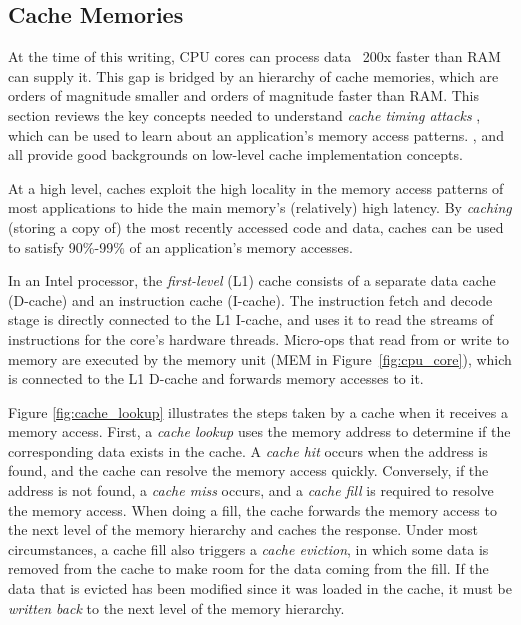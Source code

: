 \subsection{Cache Memories}
\label{sec:caching}

At the time of this writing, CPU cores can process data ~200x faster than RAM
can supply it. This gap is bridged by an hierarchy of cache memories, which are
orders of magnitude smaller and orders of magnitude faster than RAM. This
section reviews the key concepts needed to understand \textit{cache timing
attacks} \cite{banescu2011cache}, which can be used to learn about an
application's memory access patterns. \cite{smith1982cache},
\cite{patterson2013architecture} and \cite{hennessy2012architecture} all
provide good backgrounds on low-level cache implementation concepts.

At a high level, caches exploit the high locality in the memory access patterns
of most applications to hide the main memory's (relatively) high latency. By
\textit{caching} (storing a copy of) the most recently accessed code and data,
caches can be used to satisfy 90\%-99\% of an application's memory accesses.

In an Intel processor, the \textit{first-level} (L1) cache consists of a
separate data cache (D-cache) and an instruction cache (I-cache). The
instruction fetch and decode stage is directly connected to the L1 I-cache, and
uses it to read the streams of instructions for the core's hardware threads.
Micro-ops that read from or write to memory are executed by the memory unit
(MEM in Figure~\ref{fig:cpu_core}), which is connected to the L1 D-cache and
forwards memory accesses to it.

Figure \ref{fig:cache_lookup} illustrates the steps taken by a cache when it
receives a memory access. First, a \textit{cache lookup} uses the memory
address to determine if the corresponding data exists in the cache. A
\textit{cache hit} occurs when the address is found, and the cache can resolve
the memory access quickly. Conversely, if the address is not found, a
\textit{cache miss} occurs, and a \textit{cache fill} is required to resolve
the memory access. When doing a fill, the cache forwards the memory access to
the next level of the memory hierarchy and caches the response. Under most
circumstances, a cache fill also triggers a \textit{cache eviction}, in which
some data is removed from the cache to make room for the data coming from the
fill. If the data that is evicted has been modified since it was loaded in the
cache, it must be \textit{written back} to the next level of the memory
hierarchy.

